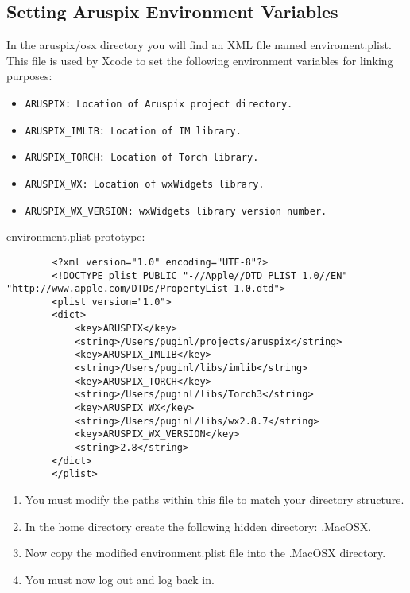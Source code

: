\documentclass[]{article}
\begin{document}
\subsection{Setting Aruspix Environment Variables}
	In the aruspix/osx directory you will find an XML file named enviroment.plist. This file is used by Xcode to set the following environment variables for linking purposes:
	\begin{itemize}
		\item \begin{verbatim}ARUSPIX: Location of Aruspix project directory.\end{verbatim}
		\item \begin{verbatim}ARUSPIX_IMLIB: Location of IM library.\end{verbatim}
		\item \begin{verbatim}ARUSPIX_TORCH: Location of Torch library.\end{verbatim}
		\item \begin{verbatim}ARUSPIX_WX: Location of wxWidgets library.\end{verbatim}
		\item \begin{verbatim}ARUSPIX_WX_VERSION: wxWidgets library version number.\end{verbatim}
	\end{itemize}

	environment.plist prototype:
	\begin{verbatim}
		<?xml version="1.0" encoding="UTF-8"?>
		<!DOCTYPE plist PUBLIC "-//Apple//DTD PLIST 1.0//EN" "http://www.apple.com/DTDs/PropertyList-1.0.dtd">
		<plist version="1.0">
		<dict>
		    <key>ARUSPIX</key>
		    <string>/Users/puginl/projects/aruspix</string>
		    <key>ARUSPIX_IMLIB</key>
		    <string>/Users/puginl/libs/imlib</string>
		    <key>ARUSPIX_TORCH</key>
		    <string>/Users/puginl/libs/Torch3</string>
		    <key>ARUSPIX_WX</key>
		    <string>/Users/puginl/libs/wx2.8.7</string>
		    <key>ARUSPIX_WX_VERSION</key>
		    <string>2.8</string>
		</dict>
		</plist>
	\end{verbatim}
	\begin{enumerate}
		\item You must modify the paths within this file to match your directory structure.
		\item In the home directory create the following hidden directory: .MacOSX.
		\item Now copy the modified environment.plist file into the .MacOSX directory.
		\item You must now log out and log back in.
	\end{enumerate}
\end{document}
